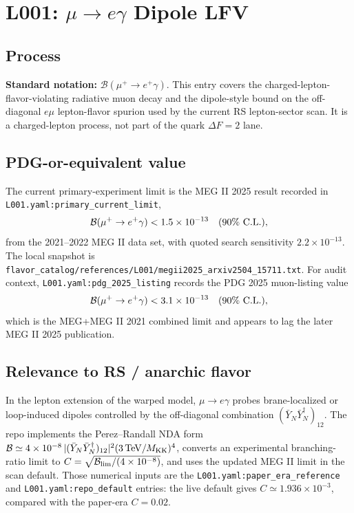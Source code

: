 
\section{L001: \texorpdfstring{\(\mu\to e\gamma\)}{mu -> e gamma} Dipole LFV}

\subsection*{Process}
\textbf{Standard notation:} \(\mathcal{B}(\mu^+\to e^+\gamma)\).
This entry covers the charged-lepton-flavor-violating radiative muon decay and
the dipole-style bound on the off-diagonal \(e\mu\) lepton-flavor spurion used
by the current RS lepton-sector scan.  It is a charged-lepton process, not part
of the quark \(\Delta F=2\) lane.

\subsection*{PDG-or-equivalent value}
The current primary-experiment limit is the MEG II 2025 result recorded in
\texttt{L001.yaml:primary\_current\_limit},
\[
  \mathcal{B}(\mu^+\to e^+\gamma) < 1.5\times 10^{-13}\quad (90\%\ {\rm C.L.}),
\]
from the 2021--2022 MEG II data set, with quoted search sensitivity
\(2.2\times10^{-13}\).  The local snapshot is
\texttt{flavor\_catalog/references/L001/megii2025\_arxiv2504\_15711.txt}.
For audit context, \texttt{L001.yaml:pdg\_2025\_listing} records the PDG 2025
muon-listing value
\[
  \mathcal{B}(\mu^+\to e^+\gamma) < 3.1\times10^{-13}\quad (90\%\ {\rm C.L.}),
\]
which is the MEG+MEG II 2021 combined limit and appears to lag the later MEG II
2025 publication.

\subsection*{Relevance to RS / anarchic flavor}
In the lepton extension of the warped model, \(\mu\to e\gamma\) probes
brane-localized or loop-induced dipoles controlled by the off-diagonal
combination \((\bar Y_N\bar Y_N^\dagger)_{12}\).  The repo implements the
Perez--Randall NDA form
\(\mathcal{B}\simeq 4\times10^{-8}\,|(\bar Y_N\bar Y_N^\dagger)_{12}|^2
(3\,{\rm TeV}/M_{\rm KK})^4\), converts an experimental branching-ratio limit
to \(C=\sqrt{\mathcal{B}_{\rm lim}/(4\times10^{-8})}\), and uses the updated
MEG II limit in the scan default.  Those numerical inputs are the
\texttt{L001.yaml:paper\_era\_reference} and \texttt{L001.yaml:repo\_default}
entries: the live default gives \(C\simeq1.936\times10^{-3}\), compared with
the paper-era \(C=0.02\).

